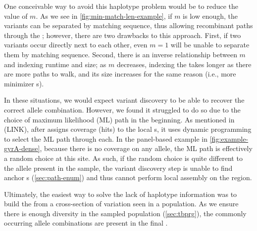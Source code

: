 One conceivable way to avoid this haplotype problem would be to reduce the value of $m$. As we see in \autoref{fig:min-match-len-example}, if $m$ is low enough, the variants can be separated by matching sequence, thus allowing recombinant paths through the \prg{}; however, there are two drawbacks to this approach. First, if two variants occur directly next to each other, even $m=1$ will be unable to separate them by matching sequence. Second, there is an inverse relationship between $m$ and indexing runtime and size; as $m$ decreases, indexing the \prg{} takes longer as there are more paths to walk, and its size increases for the same reason (i.e., more minimizer \kmer{}s).

In these situations, we would expect \denovo{} variant discovery to be able to recover the correct allele combination. However, we found it struggled to do so due to the choice of maximum likelihood (ML) path in the beginning. As mentioned in (LINK), after \pandora{} assigns \kmer{} coverage (hits) to the local \prg{}s, it uses dynamic programming to select the ML path through each. In the panel-based \prg{} example in \autoref{fig:example-gyrA-dense}, because there is no coverage on any allele, the ML path is effectively a random choice at this site. As such, if the random choice is quite different to the allele present in the sample, the \denovo{} variant discovery step is unable to find anchor \kmer{}s (\autoref{sec:path-enum}) and thus cannot perform local assembly on the region.

Ultimately, the easiest way to solve the lack of haplotype information was to build the \prg{} from a cross-section of variation seen in a population. As we ensure there is enough diversity in the sampled population (\autoref{sec:tbprg}), the commonly occurring allele combinations are present in the final \prg{}.

